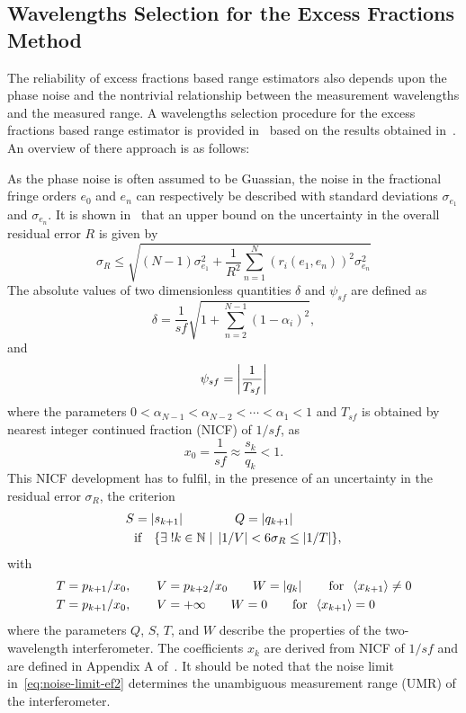 \subsection{Wavelengths Selection for the Excess Fractions Method}

The reliability of excess fractions based range estimators also depends upon the phase noise and the nontrivial relationship between the measurement wavelengths and the measured range. A wavelengths selection procedure for the excess fractions based range estimator is provided in~\cite{Falaggis_excess_fractions_2012} based on the results obtained in~\cite{Falaggis_excess_fractions_2011}. An overview of there approach is as follows:

As the phase noise is often assumed to be Guassian, the noise in the fractional fringe orders $e_0$ and $e_n$ can respectively be described with standard deviations $\sigma_{e_1}$ and $\sigma_{e_n}$. It is shown in~\cite{Falaggis_excess_fractions_2011} that an upper bound on the uncertainty in the overall residual error $R$ is given by
\begin{equation}\label{eq:noise-criterion-ef}
\sigma_R \leq \sqrt{   (N-1)\sigma_{e_1}^2 + \frac{1}{R^2} \sum_{n=1}^{N} (r_i(e_1, e_n))^2 \sigma_{e_n}^2      }
\end{equation}
The absolute values of two dimensionless quantities $\delta$ and $\psi_{sf}$ are defined as~\cite{Falaggis_excess_fractions_2011, Falaggis_excess_fractions_2012}
\[
\delta = \frac{1}{sf}\sqrt{1 + \sum_{n=2}^{N-1}(1 - \alpha_i)^2},
\]
and
\begin{equation}\label{eq:psi-NICF}
\psi_{sf} = \left\vert \frac{1}{T_{sf}} \right\vert
\end{equation}
where the parameters $0 < \alpha_{N-1} < \alpha_{N-2} < \cdots < \alpha_1 < 1$ and $T_{sf}$ is obtained by nearest integer continued fraction (NICF) of $1/sf$, as
\[
x_0 = \frac{1}{sf} \approx \frac{s_k}{q_k} < 1.
\]
This NICF development has to fulfil, in the presence of an uncertainty in the residual error $\sigma_R$, the criterion~\cite{Falaggis_excess_fractions_2011, Falaggis_excess_fractions_2012}
\begin{align}
S &= \left\vert s_{k+1} \right\vert \qquad \qquad Q = \left\vert q_{k+1} \right\vert \label{eq:noise-limit-ef1} \\ 
&\text{if} \quad \{ \exists\; !k \in \mathbb{N} \;| \; \left\vert 1/V \right\vert < 6\sigma_R \leq \left\vert 1/T \right\vert \}, \label{eq:noise-limit-ef2}
\end{align}
with 
\begin{align}
T &= p_{k+1}/x_0, \qquad V = p_{k+2}/x_0 \qquad W = \left\vert q_k \right\vert \qquad \text{for}\;\; \left\langle x_{k+1} \right\rangle \neq 0 \\
T &= p_{k+1}/x_0, \qquad V = +\infty \qquad W = 0 \qquad \text{for}\;\; \left\langle x_{k+1} \right\rangle = 0
\end{align}
where the parameters $Q$, $S$, $T$, and $W$ describe the properties of the two-wavelength interferometer. The coefficients $x_k$ are derived from NICF of $1/sf$ and are defined in Appendix A of~\cite{Falaggis_excess_fractions_2011}. It should be noted that the noise limit  in~\ref{eq:noise-limit-ef2} determines the unambiguous measurement range (UMR) of the interferometer.

